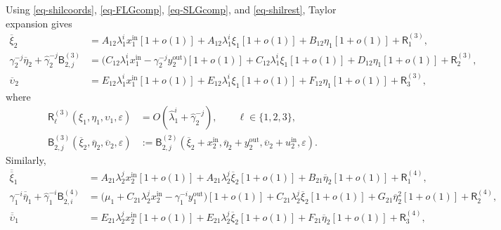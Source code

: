 \documentclass[11pt,a4paper]{article}
\theoremstyle{plain}
\theoremstyle{definition}
\theoremstyle{plain}
\numberwithin{equation}{section}
\begin{document}
Using \eqref{eq-shilcoords}, \eqref{eq-FLGcomp}, \eqref{eq-SLGcomp}, and \eqref{eq-shilrest}, Taylor expansion gives
\begin{equation}
\label{eq-FLGshil}
\begin{aligned}
\overline{\xi}_2
&=
A_{12}\lambda_1^i x_1^\mathrm{in}[1+o(1)]
+
A_{12}\lambda_1^i \xi_1[1+o(1)]
+
B_{12}\eta_1[1+o(1)]
+
\mathsf{R}_1^{(3)},
\\
\gamma_2^{-j}\overline{\eta}_2
+
\widehat{\gamma}_2^{-j}\mathsf{B}_{2,j}^{(3)}
&=
\bigl(C_{12}\lambda_1^i x_1^\mathrm{in} - \gamma_2^{-j}y_2^\mathrm{out}\bigr)[1+o(1)]
+
C_{12}\lambda_1^i \xi_1[1+o(1)]
+
D_{12}\eta_1[1+o(1)]
+
\mathsf{R}_2^{(3)},
\\
\overline{\upsilon}_2
&=
E_{12}\lambda_1^i x_1^\mathrm{in}[1+o(1)]
+
E_{12}\lambda_1^i \xi_1[1+o(1)]
+
F_{12}\eta_1[1+o(1)]
+
\mathsf{R}_3^{(3)},
\end{aligned}
\end{equation}
where
\begin{equation}
\label{eq-FLGshilsub}
\begin{aligned}
\mathsf{R}_\ell^{(3)}(\xi_1,\eta_1,\upsilon_1,\varepsilon)
&=
O(\widehat{\lambda}_1^i + \widehat{\gamma}_2^{-j}),
\qquad
\ell \in \{1,2,3\},
\\
\mathsf{B}_{2,j}^{(3)}(\overline{\xi}_2,\overline{\eta}_2,\overline{\upsilon}_2,\varepsilon)
&:=
\mathsf{B}_{2,j}^{(2)}(\overline{\xi}_2 + x_2^\mathrm{in},\overline{\eta}_2 + y_2^\mathrm{out},\overline{\upsilon}_2 + u_2^\mathrm{in},\varepsilon).
\end{aligned}
\end{equation}
Similarly,
\begin{equation}
\label{eq-SLGshil}
\begin{aligned}
\overline{\overline{\xi}}_1
&=
A_{21}\lambda_2^j x_2^\mathrm{in}[1+o(1)]
+
A_{21}\lambda_2^j \overline{\xi}_2[1+o(1)]
+
B_{21}\overline{\eta}_2[1+o(1)]
+
\mathsf{R}_1^{(4)},
\\
\gamma_1^{-i}\overline{\overline{\eta}}_1
+
\widehat{\gamma}_1^{-i}\mathsf{B}_{2,i}^{(4)}
&=
\bigl(
\mu_1
+
C_{21}\lambda_2^j x_2^\mathrm{in}
-
\gamma_1^{-i}y_1^\mathrm{out}
\bigr)[1+o(1)]
+
C_{21}\lambda_2^j \overline{\xi}_2[1+o(1)]
+
G_{21}\overline{\eta}_2^2[1+o(1)]
+
\mathsf{R}_2^{(4)},
\\
\overline{\overline{\upsilon}}_1
&=
E_{21}\lambda_2^j x_2^\mathrm{in}[1+o(1)]
+
E_{21}\lambda_2^j \overline{\xi}_2[1+o(1)]
+
F_{21}\overline{\eta}_2[1+o(1)]
+
\mathsf{R}_3^{(4)},
\end{aligned}
\end{equation}
\end{document}
